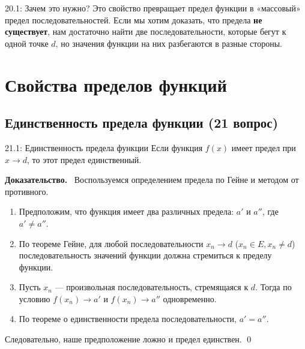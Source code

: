 \documentclass[a4paper,12pt]{article}
\newcommand{\myproof}{\textbf{Доказательство.}\ }
\begin{document}
	\begin{center}
	\end{center}
	
	\vspace{0.5cm}
	\begin{notebook}{20.1: Зачем это нужно?}
		Это свойство превращает предел функции в «массовый» предел последовательностей. Если мы хотим доказать, что предела \textbf{не существует}, нам достаточно найти две последовательности, которые бегут к одной точке $d$, но значения функции на них разбегаются в разные стороны.
	\end{notebook}
	
	
	
	
	
	
	\newpage
	\section{Свойства пределов функций}
	
	\subsection{Единственность предела функции (21 вопрос)}
	
	\begin{theorembox}{21.1: Единственность предела функции}
		Если функция $f(x)$ имеет предел при $x \to d$, то этот предел единственный.
	\end{theorembox}
	\vspace{0.5cm}
	\myproof
	Воспользуемся определением предела по Гейне и методом от противного.
	\begin{enumerate}
		\item Предположим, что функция имеет два различных предела: $a'$ и $a''$, где $a' \neq a''$.
		\item По теореме Гейне, для любой последовательности $x_n \to d$ ($x_n \in E, x_n \neq d$) последовательность значений функции должна стремиться к пределу функции.
		\item Пусть $x_n$ — произвольная последовательность, стремящаяся к $d$. Тогда по условию $f(x_n) \to a'$ и $f(x_n) \to a''$ одновременно.
		\item По теореме о единственности предела последовательности, $a' = a''$.
	\end{enumerate}
	Следовательно, наше предположение ложно и предел единствен. \qed
	
\end{document}
